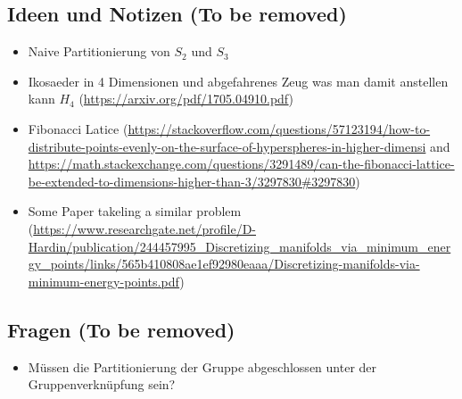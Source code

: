 
\subsection{Ideen und Notizen (To be removed)}

\begin{itemize}
\item Naive Partitionierung von $S_2$ und $S_3$
\item Ikosaeder in 4 Dimensionen und abgefahrenes Zeug was man damit anstellen kann $H_4$ (\url{https://arxiv.org/pdf/1705.04910.pdf})
\item Fibonacci Latice (\url{https://stackoverflow.com/questions/57123194/how-to-distribute-points-evenly-on-the-surface-of-hyperspheres-in-higher-dimensi} and \url{https://math.stackexchange.com/questions/3291489/can-the-fibonacci-lattice-be-extended-to-dimensions-higher-than-3/3297830#3297830})
\item Some Paper takeling a similar problem (\url{https://www.researchgate.net/profile/D-Hardin/publication/244457995_Discretizing_manifolds_via_minimum_energy_points/links/565b410808ae1ef92980eaaa/Discretizing-manifolds-via-minimum-energy-points.pdf})
\end{itemize}

\subsection{Fragen (To be removed)}
\begin{itemize}
  \item Müssen die Partitionierung der Gruppe abgeschlossen unter der Gruppenverknüpfung sein?
\end{itemize}

